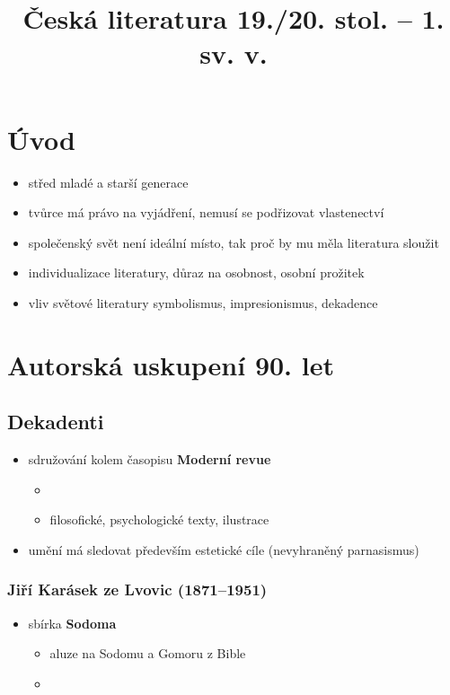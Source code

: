 \title{Česká literatura 19./20. stol. -- 1. sv. v.}


\section{Úvod}
\begin{itemize}
\item střed mladé a starší generace
\item tvůrce má právo na vyjádření, nemusí se podřizovat vlastenectví
\item společenský svět není ideální místo, tak proč by mu měla literatura sloužit
\item[\ra] individualizace literatury, důraz na osobnost, osobní prožitek 
\item vliv světové literatury \ra symbolismus, impresionismus, dekadence
\end{itemize}

\section{Autorská uskupení 90. let}
\subsection{Dekadenti}
\begin{itemize}
\item sdružování kolem časopisu \textbf{Moderní revue}
	\begin{itemize}
	\item \item filosofické, psychologické texty, ilustrace
	\end{itemize}
\item umění má sledovat především estetické cíle (nevyhraněný parnasismus)
\end{itemize}

\subsubsection{Jiří Karásek ze Lvovic (1871--1951)}
\begin{itemize}
\item sbírka \textbf{Sodoma}
	\begin{itemize}
	\item aluze na Sodomu a Gomoru z Bible
	\item 
	\end{itemize}
\end{itemize}


